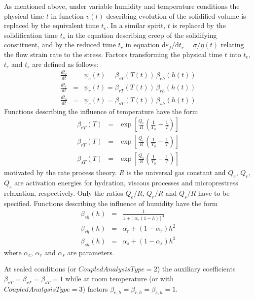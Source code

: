 \documentclass[a4paper]{article}
\begin{document}
As mentioned above, under variable humidity and temperature conditions the physical time $t$ in function $v(t)$ describing evolution of the solidified volume is replaced by the equivalent time $t_e$. In a similar spirit, $t$ is replaced by the solidification time $t_s$ in the equation describing creep of the solidifying constituent, and by the reduced time $t_r$ in equation $\mbox{d} \varepsilon_f / \mbox{d} t_r = \sigma / \eta(t)$ relating the flow strain rate to the stress.
Factors transforming the physical time $t$ into $t_e$, $t_r$ and $t_s$ are defined as follows:
\begin{eqnarray}
\label{dtedt}
 \frac{dt_e}{dt} &=& \psi_e(t) = \beta_{eT}(T(t))\, \beta_{eh}(h(t))\\
 \frac{dt_r}{dt} &=& \psi_r(t) = \beta_{rT}(T(t))\, \beta_{rh}(h(t))\\
 \frac{dt_s}{dt} &=& \psi_s(t) = \beta_{sT}(T(t))\, \beta_{sh}(h(t))
\end{eqnarray}
Functions describing the influence of temperature have the form 
\begin{eqnarray}
 \beta_{eT}(T) &=& \exp \left[ \frac{Q_e}{R}\left( \frac{1}{T_0} - \frac{1}{T} \right) \right]\\
 \beta_{rT}(T) &=& \exp \left[ \frac{Q_r}{R}\left( \frac{1}{T_0} - \frac{1}{T} \right) \right]\\
 \beta_{sT}(T) &=& \exp \left[ \frac{Q_s}{R}\left( \frac{1}{T_0} - \frac{1}{T} \right) \right]
\end{eqnarray}
motivated by the rate process theory.
$R$ is the universal gas constant and $Q_e$, $Q_r$, $Q_s$ are activation energies for hydration, viscous processes and microprestress relaxation, respectively.
Only the ratios $Q_e/R$, $Q_r/R$ and $Q_s/R$ have to be specified.
Functions describing the influence of humidity have the form 
\begin{eqnarray}
 \beta_{eh}(h) &=& \frac{1}{1+\left[\alpha_e \left( 1-h\right) \right]^4}\\
 \beta_{rh}(h) &=& \alpha_r + \left( 1 - \alpha_r \right) h^2\\
 \beta_{sh}(h) &=& \alpha_s + \left( 1 - \alpha_s \right) h^2
\end{eqnarray}
where $\alpha_e$, $\alpha_r$ and $\alpha_s$ are parameters. 

At sealed conditions (or $CoupledAnalysisType = 2$) the auxiliary coefficients $\beta_{eT} = \beta_{rT} = \beta_{sT} = 1$ while at room temperature (or with $CoupledAnalysisType = 3$) factors $\beta_{e,h} = \beta_{r,h}  = \beta_{s,h} = 1$.
\end{document}
